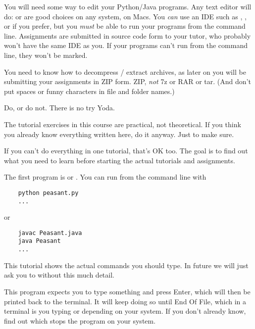You will need some way to edit your Python/Java programs. Any text editor will do:
 or  are good choices on any system,  on
Macs. You \emph{can} use an IDE such as , , or 
if you prefer, but you \emph{must} be able to run your programs from the command line.
Assignments are submitted in source code form to your tutor, who probably won't have
the same IDE as you. If your programs can't run from the command line, they won't be
marked.

You need to know how to decompress / extract  archives, as later on you will
be submitting your assignments in ZIP form. ZIP, \emph{not} 7z or RAR or tar.
(And don't put spaces or funny characters in file and folder names.)



\begin{IMPORTANT}
Do, or do not. There is no try \DSH Yoda.

The tutorial exercises in this course are practical, not theoretical. If you think
you already know everything written here, do it anyway. Just to make sure.

If you can't do everything in one tutorial, that's OK too. The goal is to find
out what you need to learn before starting the actual tutorials and assignments.
\end{IMPORTANT}

The first program is  or . You can run from the
command line with
\begin{CODE}\begin{verbatim}
    python peasant.py
    ...
\end{verbatim}\end{CODE}
or
\begin{CODE}\begin{verbatim}
    javac Peasant.java
    java Peasant
    ...
\end{verbatim}\end{CODE}

\begin{IMPORTANT}
This tutorial shows the actual commands you should type. In future we will just ask you
to  without this much detail.
\end{IMPORTANT}

This program expects you to type something and press Enter, which will then be printed
back to the terminal. It will keep doing so until End Of File, which in a terminal is
you typing  or  depending on your system. If you
don't already know, find out which stops the program on your system.

